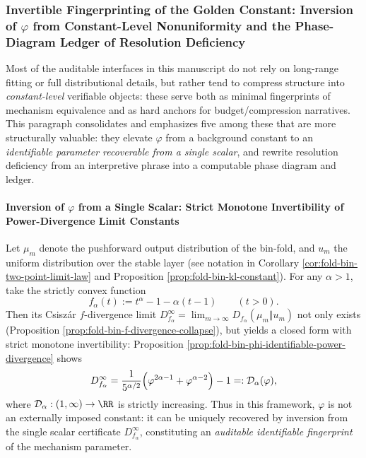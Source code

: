 
\subsubsection{Invertible Fingerprinting of the Golden Constant: Inversion of \texorpdfstring{$\varphi$}{phi} from Constant-Level Nonuniformity and the Phase-Diagram Ledger of Resolution Deficiency}\label{subsubsec:discussion-phi-inversion-phase-ledger}
Most of the auditable interfaces in this manuscript do not rely on long-range fitting or full distributional details, but rather tend to compress structure into \emph{constant-level} verifiable objects: these serve both as minimal fingerprints of mechanism equivalence and as hard anchors for budget/compression narratives.
This paragraph consolidates and emphasizes five among these that are more structurally valuable: they elevate \(\varphi\) from a background constant to an \emph{identifiable parameter recoverable from a single scalar}, and rewrite resolution deficiency from an interpretive phrase into a computable phase diagram and ledger.

\paragraph{Inversion of \texorpdfstring{$\varphi$}{phi} from a Single Scalar: Strict Monotone Invertibility of Power-Divergence Limit Constants}
Let \(\mu_m\) denote the pushforward output distribution of the bin-fold, and \(u_m\) the uniform distribution over the stable layer (see notation in Corollary \ref{cor:fold-bin-two-point-limit-law} and Proposition \ref{prop:fold-bin-kl-constant}).
For any \(\alpha>1\), take the strictly convex function
\[
f_\alpha(t):=t^\alpha-1-\alpha(t-1)\qquad(t>0).
\]
Then its Csisz\'ar \(f\)-divergence limit
\(
D_{f_\alpha}^\infty=\lim_{m\to\infty}D_{f_\alpha}(\mu_m\Vert u_m)
\)
not only exists (Proposition \ref{prop:fold-bin-f-divergence-collapse}), but yields a closed form with strict monotone invertibility: Proposition \ref{prop:fold-bin-phi-identifiable-power-divergence} shows
\[
D_{f_\alpha}^\infty
=\frac{1}{5^{\alpha/2}}\Bigl(\varphi^{2\alpha-1}+\varphi^{\alpha-2}\Bigr)-1
=:\mathcal{D}_\alpha(\varphi),
\]
where \(\mathcal{D}_\alpha:(1,\infty)\to\RR\) is strictly increasing.
Thus in this framework, \(\varphi\) is not an externally imposed constant: it can be uniquely recovered by inversion from the single scalar certificate \(D_{f_\alpha}^\infty\), constituting an \emph{auditable identifiable fingerprint} of the mechanism parameter.

